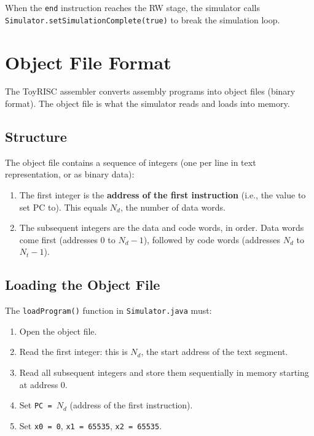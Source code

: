 \documentclass[12pt,a4paper]{article}
\begin{document}
When the \texttt{end} instruction reaches the RW stage, the simulator calls \texttt{Simulator.setSimulationComplete(true)} to break the simulation loop.

\section{Object File Format}

The ToyRISC assembler converts assembly programs into object files (binary format). The object file is what the simulator reads and loads into memory.

\subsection{Structure}

The object file contains a sequence of integers (one per line in text representation, or as binary data):

\begin{enumerate}
    \item The first integer is the \textbf{address of the first instruction} (i.e., the value to set PC to). This equals $N_d$, the number of data words.
    \item The subsequent integers are the data and code words, in order. Data words come first (addresses 0 to $N_d - 1$), followed by code words (addresses $N_d$ to $N_t - 1$).
\end{enumerate}

\subsection{Loading the Object File}

The \texttt{loadProgram()} function in \texttt{Simulator.java} must:

\begin{enumerate}
    \item Open the object file.
    \item Read the first integer: this is $N_d$, the start address of the text segment.
    \item Read all subsequent integers and store them sequentially in memory starting at address 0.
    \item Set \texttt{PC = $N_d$} (address of the first instruction).
    \item Set \texttt{x0 = 0}, \texttt{x1 = 65535}, \texttt{x2 = 65535}.
\end{enumerate}
\end{document}
